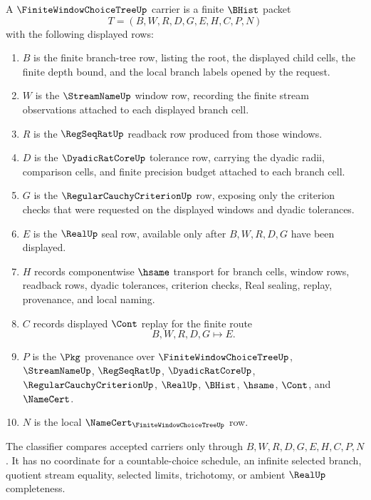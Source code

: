 \begin{definition}
\label{def:finite-window-choice-tree-carrier}
A $\FiniteWindowChoiceTreeUp$ carrier is a finite $\BHist$ packet
$$
T=(B,W,R,D,G,E,H,C,P,N)
$$
with the following displayed rows:
\begin{enumerate}
\item $B$ is the finite branch-tree row, listing the root, the displayed child cells, the finite depth bound, and the local branch labels opened by the request.
\item $W$ is the $\StreamNameUp$ window row, recording the finite stream observations attached to each displayed branch cell.
\item $R$ is the $\RegSeqRatUp$ readback row produced from those windows.
\item $D$ is the $\DyadicRatCoreUp$ tolerance row, carrying the dyadic radii, comparison cells, and finite precision budget attached to each branch cell.
\item $G$ is the $\RegularCauchyCriterionUp$ row, exposing only the criterion checks that were requested on the displayed windows and dyadic tolerances.
\item $E$ is the $\RealUp$ seal row, available only after $B,W,R,D,G$ have been displayed.
\item $H$ records componentwise $\hsame$ transport for branch cells, window rows, readback rows, dyadic tolerances, criterion checks, Real sealing, replay, provenance, and local naming.
\item $C$ records displayed $\Cont$ replay for the finite route
$$
B,W,R,D,G \longmapsto E .
$$
\item $P$ is the $\Pkg$ provenance over $\FiniteWindowChoiceTreeUp$, $\StreamNameUp$, $\RegSeqRatUp$, $\DyadicRatCoreUp$, $\RegularCauchyCriterionUp$, $\RealUp$, $\BHist$, $\hsame$, $\Cont$, and $\NameCert$.
\item $N$ is the local $\NameCert_{\FiniteWindowChoiceTreeUp}$ row.
\end{enumerate}
The classifier compares accepted carriers only through $B,W,R,D,G,E,H,C,P,N$. It has no coordinate for a countable-choice schedule, an infinite selected branch, quotient stream equality, selected limits, trichotomy, or ambient $\RealUp$ completeness.
\end{definition}


